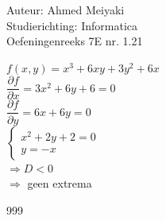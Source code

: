 \documentclass[a4paper]{article}
\begin{document}
  
\noindent \large Auteur: Ahmed Meiyaki \\
\noindent \large Studierichting: Informatica\\
\noindent \large Oefeningenreeks 7E nr. 1.21\\

\medskip

\normalsize

$f(x,y) = x^3 + 6xy +3y^2 + 6x$\\

$\dfrac{\partial f}{\partial x} = 3x^2 + 6y + 6 = 0 $\\

$\dfrac{\partial f}{\partial y} = 6x + 6y = 0 $\\

$\left\{
\begin{array}{lll}
	x^2 +2y + 2 = 0 \\
	y = -x
	
\end{array} \right.$\\

$\Rightarrow D < 0 $\\

$\Rightarrow$ geen extrema \\

\begin{thebibliography}{999}
\end{thebibliography}
\end{document}
